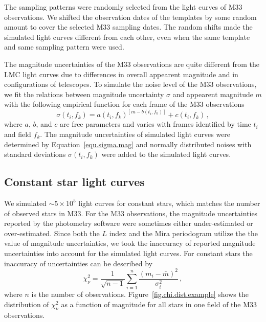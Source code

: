 The sampling patterns were randomly selected from the light curves of M33 observations. We shifted the observation dates of the templates by some random amount to cover the selected M33 sampling dates. The random shifts made the simulated light curves different from each other, even when the same template and same sampling pattern were used.

The magnitude uncertainties of the M33 observations are quite different from the LMC light curves due to differences in overall appearent magnitude and in configurations of telescopes. To simulate the noise level of the M33 observations, we fit the relations between magnitude uncertainty $\sigma$ and appearent magnitude $m$ with the following empirical function for each frame of the M33 observations
\begin{equation}
\sigma(t_i,f_k) = a(t_i,f_k)^{[m-b(t_i,f_k)]} + c(t_i,f_k)\,, \label{equ.sigma.mag}
\end{equation}
where $a$, $b$, and $c$ are free parameters and varies with frames identified by time $t_i$ and field $f_k$. The magnitude uncertainties of simulated light curves were determined by Equation~\ref{equ.sigma.mag} and normally distributed noises with standard deviations $\sigma(t_i,f_k)$ were added to the simulated light curves.

\subsection{Constant star light curves}

We simulated $\sim 5\times 10^5$ light curves for constant stars, which matches the number of observed stars in M33. For the M33 observations, the magnitude uncertainties reported by the photometry software were sometimes either under-estimated or over-estimated. Since both the $L$ index and the Mira periodogram utilize the the value of magnitude uncertainties, we took the inaccuracy of reported magnitude uncertainties into account for the simulated light curves. For constant stars the inaccuracy of uncertainties can be described by
\begin{equation}
\chi_\nu^2 = \frac{1}{\sqrt{n-1}}\sum_{i=1}^n\frac{(m_i-\bar m)^2}{\sigma_i^2}\,,
\end{equation}
where $n$ is the number of observations. Figure~\ref{fig.chi.dist.example} shows the distribution of $\chi_\nu^2$ as a function of magnitude for all stars in one field of the M33 observations.

